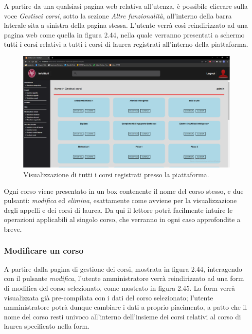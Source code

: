 \documentclass [a4paper,11pt]{book}
\begin{document}
A partire da una qualsiasi pagina web relativa all'utenza, è possibile cliccare sulla voce \emph{Gestisci corsi}, sotto la sezione \emph{Altre funzionalità}, all'interno della barra laterale sita a sinistra della pagina stessa. L'utente verrà così reindirizzato ad una pagina web come quella in figura 2.44, nella quale verranno presentati a schermo tutti i corsi relativi a tutti i corsi di laurea registrati all'interno della piattaforma.

\begin{figure}
\centering
\includegraphics[scale=0.3]{figura2-44.png}
\caption{Visualizzazione di tutti i corsi registrati presso la piattaforma.}
\end{figure}

Ogni corso viene presentato in un box contenente il nome del corso stesso, e due pulsanti: \emph{modifica} ed \emph{elimina}, esattamente come avviene per la visualizzazione degli appelli e dei corsi di laurea. Da qui il lettore potrà facilmente intuire le operazioni applicabili al singolo corso, che verranno in ogni caso approfondite a breve.

\medskip 

\subsubsection{Modificare un corso}

A partire dalla pagina di gestione dei corsi, mostrata in figura 2.44, interagendo con il pulsante \emph{modifica}, l'utente amministratore verrà reindirizzato ad una form di modifica del corso selezionato, come mostrato in figura 2.45. La form verrà visualizzata già pre-compilata con i dati del corso selezionato; l'utente amministratore potrà dunque cambiare i dati a proprio piacimento, a patto che il nome del corso resti univoco all'interno dell'insieme dei corsi relativi al corso di laurea specificato nella form.
\end{document}
